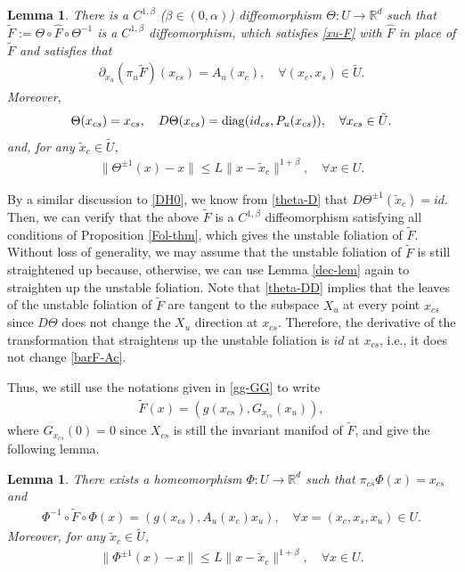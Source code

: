 \documentclass[reqno]{amsart}
\numberwithin{equation}{section}
\newtheorem{lemma}[theorem]{Lemma}
\begin{document}
\begin{lemma}\label{co-redu}
There is a
$C^{1,\beta}$  {\rm (}$\beta\in (0,\alpha)${\rm )}
diffeomorphism $\Theta:U\to \mathbb{R}^d$ such that
$
\tilde{F}:=\Theta\circ \hat F\circ \Theta^{-1}
$
is a $C^{1,\beta}$ diffeomorphism, which satisfies \eqref{xu-F} with $\hat F$ in place of $\tilde{F}$ and satisfies that
\begin{align}\label{barF-Ac}
\partial_{x_u}(\pi_u \tilde{F})(x_{cs})=A_u(x_c),\quad \forall (x_c,x_s)\in \tilde U.
\end{align}
Moreover,
\begin{align}\label{theta-DD}
\Theta(x_{cs})=x_{cs},\quad D\Theta(x_{cs})={\rm diag}(id_{cs}, P_u(x_{cs})),\quad \forall x_{cs}\in \tilde U.
\end{align}
and, for any $\tilde{x}_c\in \tilde U$,
\begin{align}\label{theta-D}
\|\Theta^{\pm 1}(x)-x\|\le L\|x-\tilde{x}_c\|^{1+\beta}, \quad \forall x\in U.
\end{align}
\end{lemma}

By a similar discussion to \eqref{DH0}, we know from \eqref{theta-D} that $D\Theta^{\pm 1}(\tilde x_c)=id$. Then, we can verify that the above $\tilde{F}$ is a $C^{1,\beta}$ diffeomorphism satisfying all conditions of Proposition \ref{Fol-thm}, which gives the unstable foliation of $\tilde{F}$. Without loss of generality, we may assume that the unstable foliation of $\tilde{F}$ is still straightened up because, otherwise, we can use Lemma \ref{dec-lem} again to straighten up the unstable foliation. Note that \eqref{theta-DD} implies that the leaves of the unstable foliation of $\tilde{F}$ are tangent to the subspace $X_u$ at every point $x_{cs}$ since $D\Theta$ does not change the $X_u$ direction at $x_{cs}$. Therefore, the derivative of the transformation that straightens up the unstable foliation is $id$ at $x_{cs}$, i.e., it does not change \eqref{barF-Ac}.

Thus, we still use the notations given in \eqref{gg-GG} to write
\begin{align}\label{barF-FP}
\tilde{F}(x)=(g(x_{cs}), G_{x_{cs}}(x_u)),
\end{align}
where $G_{x_{cs}}(0)=0$ since $X_{cs}$ is still the invariant manifod of $\tilde F$, and give the following lemma.


\begin{lemma}\label{pro-scu}
There exists a homeomorphism $\Phi: U \to \mathbb{R}^d$ such that $\pi_{cs}\Phi(x)=x_{cs}$ and
\begin{align}\label{PSI-F}
\Phi^{-1}\circ \tilde{F}\circ \Phi(x)=(g(x_{cs}),A_u(x_c)x_u),\quad \forall x=(x_{c},x_s, x_u)\in U.
\end{align}
Moreover, for any $\tilde{x}_c\in \tilde U$,
\begin{align}\label{Dscu-9}
\|\Phi^{\pm 1}(x)-x\|\le L\|x-\tilde{x}_c\|^{1+ \beta}, \quad \forall x\in U.
\end{align}
\end{lemma}
\end{document}

